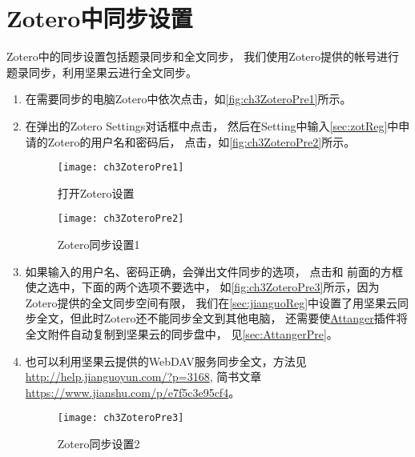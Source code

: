 \documentclass[theorem=false,mathfont=none,openany,sub3section]{easybook}
\begin{document}
\section{Zotero中同步设置}\label{sec:syn}
	Zotero中的同步设置包括题录同步和全文同步，
我们使用Zotero提供的帐号进行题录同步，利用坚果云进行全文同步。
\begin{enumerate}
	\item 
	在需要同步的电脑Zotero中依次点击，如\autoref{fig:ch3ZoteroPre1}所示。
	\item
	在弹出的Zotero Settings对话框中点击，
	然后在Setting中输入\cref{sec:zotReg}中申请的Zotero的用户名和密码后，
	点击，如\autoref{fig:ch3ZoteroPre2}所示。
	\begin{figure}[t]
		\centering
		\begin{minipage}[t]{\dimexpr0.5\textwidth-4em}
			\centering
			\texttt{[image: ch3ZoteroPre1]}
			\caption{打开Zotero设置}
			\label{fig:ch3ZoteroPre1}
		\end{minipage}
		\begin{minipage}[t]{\dimexpr0.5\textwidth-4em}
			\centering
			\texttt{[image: ch3ZoteroPre2]}
			\caption{Zotero同步设置1}
			\label{fig:ch3ZoteroPre2}
		\end{minipage}
	\end{figure}
	\item
	如果输入的用户名、密码正确，会弹出文件同步的选项，
	点击和
	前面的方框使之选中，下面的两个选项不要选中，
	如\autoref{fig:ch3ZoteroPre3}所示，因为Zotero提供的全文同步空间有限，
	我们在\cref{sec:jianguoReg}中设置了用坚果云同步全文，但此时Zotero还不能同步全文到其他电脑，
	还需要使\href{https://github.com/MuiseDestiny/zotero-attanger}{Attanger}插件将全文附件自动复制到坚果云的同步盘中，
	见\cref{sec:AttangerPre}。
	\item				  	
	也可以利用坚果云提供的WebDAV服务同步全文，方法见\url{http://help.jianguoyun.com/?p=3168},
	简书文章\url{https://www.jianshu.com/p/e7f5c3e95cf4}。			  
	\begin{figure}[htbp]
		\centering
		\texttt{[image: ch3ZoteroPre3]}
		\caption{Zotero同步设置2}
		\label{fig:ch3ZoteroPre3}
	\end{figure}
\end{enumerate}
\end{document}
